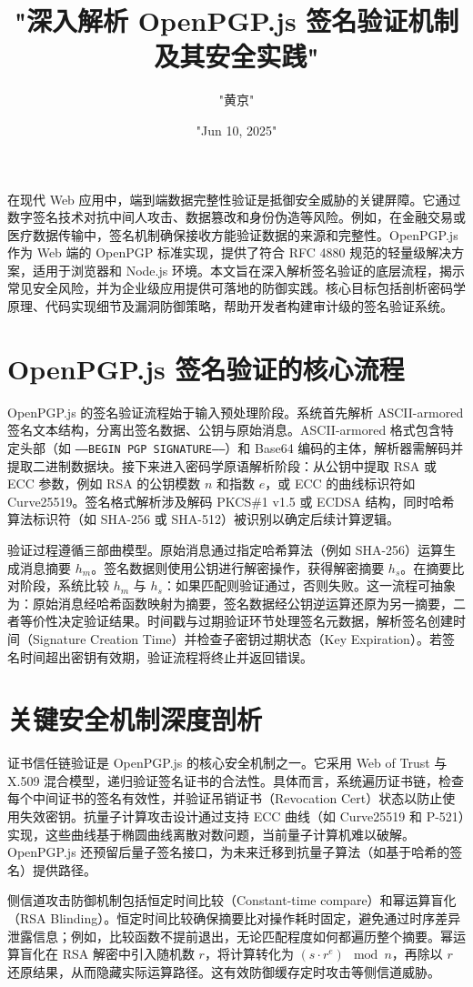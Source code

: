 \title{"深入解析 OpenPGP.js 签名验证机制及其安全实践"}
\author{"黄京"}
\date{"Jun 10, 2025"}
\maketitle
在现代 Web 应用中，端到端数据完整性验证是抵御安全威胁的关键屏障。它通过数字签名技术对抗中间人攻击、数据篡改和身份伪造等风险。例如，在金融交易或医疗数据传输中，签名机制确保接收方能验证数据的来源和完整性。OpenPGP.js 作为 Web 端的 OpenPGP 标准实现，提供了符合 RFC 4880 规范的轻量级解决方案，适用于浏览器和 Node.js 环境。本文旨在深入解析签名验证的底层流程，揭示常见安全风险，并为企业级应用提供可落地的防御实践。核心目标包括剖析密码学原理、代码实现细节及漏洞防御策略，帮助开发者构建审计级的签名验证系统。\par
\chapter{OpenPGP.js 签名验证的核心流程}
OpenPGP.js 的签名验证流程始于输入预处理阶段。系统首先解析 ASCII-armored 签名文本结构，分离出签名数据、公钥与原始消息。ASCII-armored 格式包含特定头部（如 \texttt{-----BEGIN PGP SIGNATURE-----}）和 Base64 编码的主体，解析器需解码并提取二进制数据块。接下来进入密码学原语解析阶段：从公钥中提取 RSA 或 ECC 参数，例如 RSA 的公钥模数 $n$ 和指数 $e$，或 ECC 的曲线标识符如 Curve25519。签名格式解析涉及解码 PKCS\#{}1 v1.5 或 ECDSA 结构，同时哈希算法标识符（如 SHA-256 或 SHA-512）被识别以确定后续计算逻辑。\par
验证过程遵循三部曲模型。原始消息通过指定哈希算法（例如 SHA-256）运算生成消息摘要 $h_m$。签名数据则使用公钥进行解密操作，获得解密摘要 $h_s$。在摘要比对阶段，系统比较 $h_m$ 与 $h_s$：如果匹配则验证通过，否则失败。这一流程可抽象为：原始消息经哈希函数映射为摘要，签名数据经公钥逆运算还原为另一摘要，二者等价性决定验证结果。时间戳与过期验证环节处理签名元数据，解析签名创建时间（Signature Creation Time）并检查子密钥过期状态（Key Expiration）。若签名时间超出密钥有效期，验证流程将终止并返回错误。\par
\chapter{关键安全机制深度剖析}
证书信任链验证是 OpenPGP.js 的核心安全机制之一。它采用 Web of Trust 与 X.509 混合模型，递归验证签名证书的合法性。具体而言，系统遍历证书链，检查每个中间证书的签名有效性，并验证吊销证书（Revocation Cert）状态以防止使用失效密钥。抗量子计算攻击设计通过支持 ECC 曲线（如 Curve25519 和 P-521）实现，这些曲线基于椭圆曲线离散对数问题，当前量子计算机难以破解。OpenPGP.js 还预留后量子签名接口，为未来迁移到抗量子算法（如基于哈希的签名）提供路径。\par
侧信道攻击防御机制包括恒定时间比较（Constant-time compare）和幂运算盲化（RSA Blinding）。恒定时间比较确保摘要比对操作耗时固定，避免通过时序差异泄露信息；例如，比较函数不提前退出，无论匹配程度如何都遍历整个摘要。幂运算盲化在 RSA 解密中引入随机数 $r$，将计算转化为 $(s \cdot r^e) \mod n$，再除以 $r$ 还原结果，从而隐藏实际运算路径。这有效防御缓存定时攻击等侧信道威胁。\par
